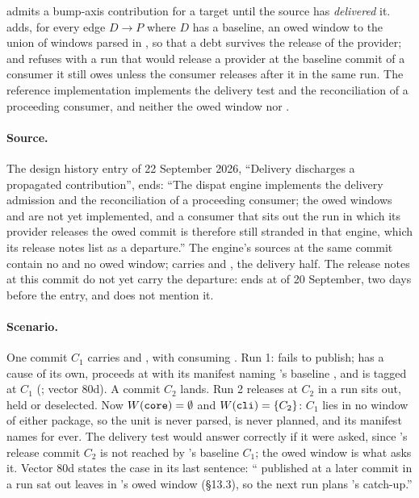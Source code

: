 \begin{obligation}
\label{ob:owed}
 admits a bump-axis contribution for a target until the source
has \emph{delivered} it.  adds, for every edge $D \to P$ where $D$
has a baseline, an owed window  to the union of
windows parsed in , so that a debt survives the release of the
provider; and  refuses with  a run that would release a
provider at the baseline commit of a consumer it still owes unless the
consumer releases after it in the same run. The reference implementation
implements the delivery test and the reconciliation of a proceeding consumer,
and neither the owed window nor .
\end{obligation}

\paragraph{Source.} The design history entry of 22 September 2026,
``Delivery discharges a propagated contribution'', ends: ``The dispat engine
implements the delivery admission and the reconciliation of a proceeding
consumer; the owed windows and  are not yet implemented, and a
consumer that sits out the run in which its provider releases the owed commit
is therefore still stranded in that engine, which its release notes list as a
departure.'' The engine's sources at the same commit contain no 
and no owed window;  carries  and
, the delivery half. The release notes at this commit do
not yet carry the departure:  ends at
 of 20 September, two days before the entry, and
 does not mention it.

\paragraph{Scenario.} One commit $C_1$ carries  and
, with  consuming . Run 1:
 fails to publish;  has a cause of its own, proceeds at
 with its manifest naming 's baseline ,
and is tagged at $C_1$ (; vector 80d). A commit $C_2$ lands. Run 2
releases  at $C_2$ in a run  sits out, held or
deselected. Now $W(\texttt{core}) = \emptyset$ and $W(\texttt{cli}) = \{C_2\}$:
$C_1$ lies in no window of either package, so the unit is never parsed,
 is never planned, and its manifest names  for
ever. The delivery test would answer correctly if it were asked, since
's release commit $C_2$ is not reached by 's baseline
$C_1$; the owed window is what asks it. Vector 80d states the case in its
last sentence: `` published at a later commit in a run 
sat out leaves  in 's owed window (\S13.3), so the next run
plans 's catch-up.''


